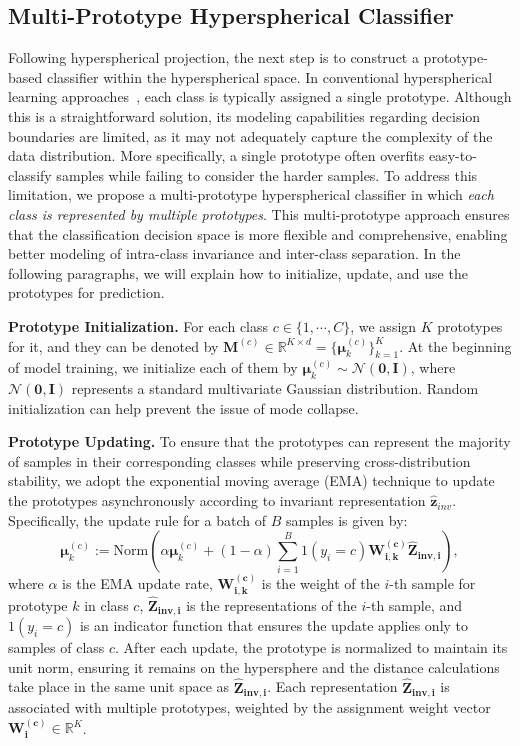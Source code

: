 \subsection{Multi-Prototype Hyperspherical Classifier} \label{subsec:proto}
Following hyperspherical projection, the next step is to construct a prototype-based classifier within the hyperspherical space. In conventional hyperspherical learning approaches~\citep{ke2022hyperspherical}, each class is typically assigned a single prototype. Although this is a straightforward solution, its modeling capabilities regarding decision boundaries are limited, as it may not adequately capture the complexity of the data distribution. More specifically, a single prototype often overfits easy-to-classify samples while failing to consider the harder samples. To address this limitation, we propose a multi-prototype hyperspherical classifier in which \textit{each class is represented by multiple prototypes}. This multi-prototype approach ensures that the classification decision space is more flexible and comprehensive, enabling better modeling of intra-class invariance and inter-class separation. In the following paragraphs, we will explain how to initialize, update, and use the prototypes for prediction.

\noindent\textbf{Prototype Initialization.} 
For each class $c \in \{1, \cdots, C\}$, we assign $K$ prototypes for it, and they can be denoted by $\mathbf{M}^{(c)} \in \mathbb{R}^{K \times d} = \{ \boldsymbol{\mu}_{k}^{(c)}\}^{K}_{k=1}$. At the beginning of model training, we initialize each of them by $\boldsymbol{\mu}_{k}^{(c)} \sim \mathcal{N}(\textbf{0}, \textbf{I})$, where $\mathcal{N}(\textbf{0}, \textbf{I})$ represents a standard multivariate Gaussian distribution. Random initialization can help prevent the issue of mode collapse.

\noindent\textbf{Prototype Updating.} 
To ensure that the prototypes can represent the majority of samples in their corresponding classes while preserving  cross-distribution stability, we adopt the exponential moving average (EMA) technique to update the prototypes asynchronously according to invariant representation $\hat{\mathbf{z}}_{inv}$. Specifically, the update rule for a batch of $B$ samples is given by:
\begin{equation} \label{eq: update_prototype}
    \boldsymbol{\mu}_{k}^{(c)} := \text{Norm}\left( \alpha \boldsymbol{\mu}_{k}^{(c)} + (1 - \alpha) \sum_{i=1}^{B} 1(y_i = c) \mathbf{W_{i,k}^{(c)}} \mathbf{\hat{Z}_{inv,i}} \right), 
\end{equation}
where $\alpha$ is the EMA update rate, $\mathbf{W_{i,k}^{(c)}} $ is the weight of the $i$-th sample for prototype $k$ in class $c$, $\mathbf{\hat{Z}_{inv,i}}$ is the representations of the $i$-th sample, and ${1}(y_i = c)$ is an indicator function that ensures the update applies only to samples of class $c$.  After each update, the prototype is normalized to maintain its unit norm, ensuring it remains on the hypersphere and the distance calculations take place in the same unit space as $\mathbf{\hat{Z}_{inv,i}}$. Each representation $\mathbf{\hat{Z}_{inv,i}}$ is associated with multiple prototypes, weighted by the assignment weight vector $\mathbf{W_{i}^{(c)}} \in \mathbb{R}^{K}$. 

